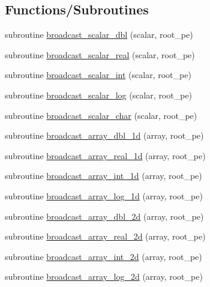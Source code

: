 \subsection*{Functions/Subroutines}
\begin{DoxyCompactItemize}
\item 
subroutine \hyperlink{namespaceice__broadcast_ac16c527490aae65b0e6e231479f259e5}{broadcast\_\-scalar\_\-dbl} (scalar, root\_\-pe)
\item 
subroutine \hyperlink{namespaceice__broadcast_a8b0dd76d223d7f8a6d4df7e90a347877}{broadcast\_\-scalar\_\-real} (scalar, root\_\-pe)
\item 
subroutine \hyperlink{namespaceice__broadcast_a690996befa457dac88bf595ebc00c927}{broadcast\_\-scalar\_\-int} (scalar, root\_\-pe)
\item 
subroutine \hyperlink{namespaceice__broadcast_ac3acffb99e12d5eb798f33eb05ad47ce}{broadcast\_\-scalar\_\-log} (scalar, root\_\-pe)
\item 
subroutine \hyperlink{namespaceice__broadcast_a3adeb2c1c8890bb5af4f4c57a6c969c3}{broadcast\_\-scalar\_\-char} (scalar, root\_\-pe)
\item 
subroutine \hyperlink{namespaceice__broadcast_a662e8645225841aedf367a75226b54e6}{broadcast\_\-array\_\-dbl\_\-1d} (array, root\_\-pe)
\item 
subroutine \hyperlink{namespaceice__broadcast_a8d3b349a33e8f578462da5b5506c2b21}{broadcast\_\-array\_\-real\_\-1d} (array, root\_\-pe)
\item 
subroutine \hyperlink{namespaceice__broadcast_a8e560ce5af3aaac47d995fef6d8227f5}{broadcast\_\-array\_\-int\_\-1d} (array, root\_\-pe)
\item 
subroutine \hyperlink{namespaceice__broadcast_a74b3384660f377db70f24bfc4ef599d8}{broadcast\_\-array\_\-log\_\-1d} (array, root\_\-pe)
\item 
subroutine \hyperlink{namespaceice__broadcast_a52007fa2d05a9a9202b79ae38da8dfc8}{broadcast\_\-array\_\-dbl\_\-2d} (array, root\_\-pe)
\item 
subroutine \hyperlink{namespaceice__broadcast_a831b40f3a8d5b4ed01be2eca8a3b4cc7}{broadcast\_\-array\_\-real\_\-2d} (array, root\_\-pe)
\item 
subroutine \hyperlink{namespaceice__broadcast_a9b33c193842a02dc83a74c98cafd4dd0}{broadcast\_\-array\_\-int\_\-2d} (array, root\_\-pe)
\item 
subroutine \hyperlink{namespaceice__broadcast_adb50d2bd8cebc4b5529e8120f903b119}{broadcast\_\-array\_\-log\_\-2d} (array, root\_\-pe)

\end{DoxyCompactItemize}
